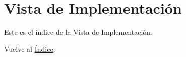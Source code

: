 \newpage
\section{Vista de Implementación}
Este es el índice de la Vista de Implementación.

Vuelve al \hyperlink{toc}{Índice}.
